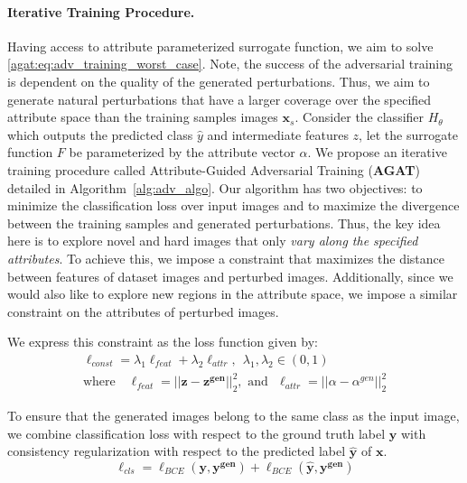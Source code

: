 \paragraph{Iterative Training Procedure.}
Having access to attribute parameterized surrogate function, we aim to solve \eqref{agat:eq:adv_training_worst_case}. Note, the success of the adversarial training is dependent on the quality of the generated perturbations. Thus, we aim to generate natural perturbations that have a larger coverage over the specified attribute space than the training samples images $\mathbf{x}_s$. Consider the classifier $H_\theta$ which outputs the predicted class $\hat{y}$ and intermediate features $z$, let the surrogate function ${F}$ be parameterized by the attribute vector $\alpha$. We propose an iterative training procedure called Attribute-Guided Adversarial Training (\textbf{AGAT}) detailed in Algorithm~\ref{alg:adv_algo}. Our algorithm has two objectives: to minimize the classification loss over input images and to maximize the divergence between the training samples and generated perturbations. Thus, the key idea here is to explore novel and hard images that only \emph{vary along the specified attributes}. To achieve this, we impose a constraint that maximizes the distance between features of dataset images and perturbed images. Additionally, since we would also like to explore new regions in the attribute space, we impose a similar constraint on the attributes of perturbed images.


We express this constraint as the loss function given by:
\begin{equation}
    \begin{split}
        \ell_{const} = \lambda_1\ell_{feat} + \lambda_2\ell_{attr},~~\lambda_1, \lambda_2 \in (0,1)\\
        \text{where~~ }
        \ell_{feat} = ||\mathbf{z} - \mathbf{z^{gen}}||_2^2,
        \text{~and~~}
        \ell_{attr} = ||\alpha - \alpha^{gen}||_2^2
    \end{split}
    \label{agat:eq:loss_constraint}
\end{equation}


To ensure that the generated images belong to the same class as the input image, we combine classification loss with respect to the ground truth label $\mathbf{y}$ with consistency regularization with respect to the predicted label $\mathbf{\hat{y}}$ of $\mathbf{x}$.
\begin{equation}
    \ell_{cls} = \ell_{BCE}(\mathbf{y}, \mathbf{y^{gen}}) + \ell_{BCE}(\mathbf{\hat{y}}, \mathbf{y^{gen}})
    \label{agat:eq:loss_distill}
\end{equation}


